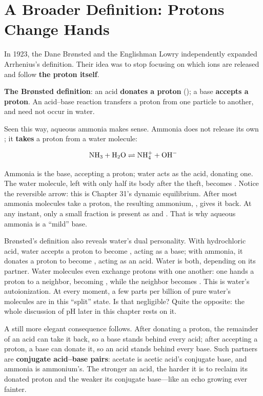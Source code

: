 \section{A Broader Definition: Protons Change Hands}

In 1923, the Dane Brønsted and the Englishman Lowry independently expanded Arrhenius's definition. Their idea was to stop focusing on which ions are released and follow \textbf{the proton itself}.

\begin{qiaoliang}
\textbf{The Brønsted definition}: an acid \textbf{donates a proton} (); a base \textbf{accepts a proton}. An acid--base reaction transfers a proton from one particle to another, and need not occur in water.
\end{qiaoliang}

Seen this way, aqueous ammonia makes sense. Ammonia does not release its own ; it \textbf{takes} a proton from a water molecule:

\[\mathrm{NH_3} + \mathrm{H_2O} \rightleftharpoons \mathrm{NH_4^+} + \mathrm{OH^-}\]

Ammonia is the base, accepting a proton; water acts as the acid, donating one. The water molecule, left with only half its body after the theft, becomes . Notice the reversible arrow: this is Chapter 31's dynamic equilibrium. After most ammonia molecules take a proton, the resulting ammonium, , gives it back. At any instant, only a small fraction is present as  and . That is why aqueous ammonia is a ``mild'' base.

Brønsted's definition also reveals water's dual personality. With hydrochloric acid, water accepts a proton to become , acting as a base; with ammonia, it donates a proton to become , acting as an acid. Water is both, depending on its partner. Water molecules even exchange protons with one another: one hands a proton to a neighbor, becoming , while the neighbor becomes . This is water's autoionization. At every moment, a few parts per billion of pure water's molecules are in this ``split'' state. Is that negligible? Quite the opposite: the whole discussion of pH later in this chapter rests on it.

A still more elegant consequence follows. After donating a proton, the remainder of an acid can take it back, so a base stands behind every acid; after accepting a proton, a base can donate it, so an acid stands behind every base. Such partners are \textbf{conjugate acid--base pairs}: acetate is acetic acid's conjugate base, and ammonia is ammonium's. The stronger an acid, the harder it is to reclaim its donated proton and the weaker its conjugate base---like an echo growing ever fainter.

